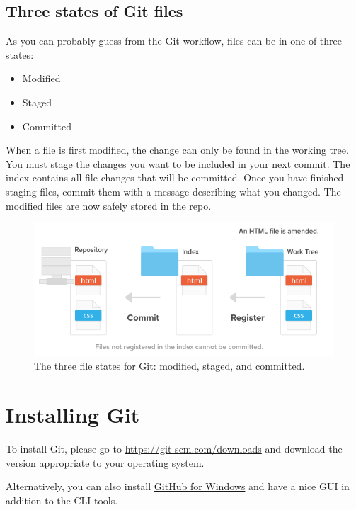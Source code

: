 \documentclass[10pt,a4paper,english]{report}
\begin{document}
    \section{Three states of Git files}

    As you can probably guess from the Git workflow, files can be in one of three states:
    \begin{itemize}
        \item Modified
        \item Staged
        \item Committed
    \end{itemize}

    When a file is first modified, the change can only be found in the working tree. You must stage the changes you want to be included in your next commit. The index contains all file changes that will be committed. Once you have finished staging files, commit them with a message describing what you changed. The modified files are now safely stored in the repo.

    \begin{figure}[ht]
    \begin{center}
    \includegraphics[scale=0.5]{images/git_workflow_001.png}
    \end{center}
    \caption{The three file states for Git: modified, staged, and committed.}
    \end{figure}

\chapter{Installing Git}
    \label{chap:installing}

    To install Git, please go to \href{https://git-scm.com/downloads}{https://git-scm.com/downloads} and download the version appropriate to your operating system.

    Alternatively, you can also install \href{https://windows.github.com}{GitHub for Windows} and have a nice GUI in addition to the CLI tools.
\end{document}
